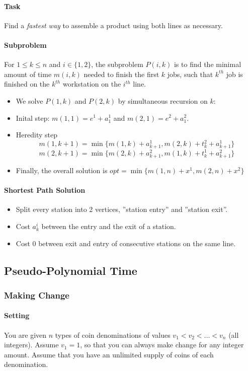 \paragraph{Task}
Find a \textit{fastest way} to assemble a product using both lines as necessary.

\paragraph{Subproblem}
For \(1 \leq k \leq n\) and \(i \in \{1, 2\}\), the subproblem \(P(i,k)\) is to find the minimal amount of time \(m(i,k)\) needed to finish the first \(k\) jobs, such that \(k^{th}\) job is finished on the \(k^{th}\) workstation on the \(i^{th}\) line.
\begin{itemize}
    \item We solve \(P(1,k)\) and \(P(2,k)\) by simultaneous recursion on \(k\):
    \item Inital step: \(m(1,1)=e^1 + a_1^1\) and \(m(2,1) = e^2 + a_1^2\).
    \item Heredity step 
    \[m(1,k+1) = \min\{m(1,k) + a_{k+1}^1, m(2,k) + t_k^2 + a_{k+1}^1\}\]
    \[m(2,k+1) = \min\{m(2,k) + a_{k+1}^2, m(1,k) + t_k^1 + a_{k+1}^2\}\]
    \item Finally, the overall solution is \(opt = \min\{m(1,n) + x^1, m(2,n) + x^2\}\)
\end{itemize}

\paragraph{Shortest Path Solution}
\begin{itemize}
    \item Split every station into 2 vertices, ''station entry'' and ''station exit''.
    \item Cost \(a_k^i\) between the entry and the exit of a station.
    \item Cost 0 between exit and entry of consecutive stations on the same line.
\end{itemize}

\subsection{Pseudo-Polynomial Time}
\subsubsection{Making Change}
\paragraph{Setting}
You are given \(n\) types of coin denominations of values \(v_1 < v_2 < \dots < v_n\) (all integers). Assume \(v_1 = 1\), so that you can always make change for any integer amount. Assume that you have an unlimited supply of coins of each denomination.

